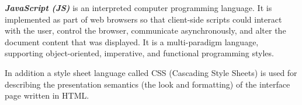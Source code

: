 \emph {\bf JavaScript (JS)} is an interpreted computer programming language. It is  implemented as part of web browsers so that client-side scripts could interact with the user, control the browser, communicate asynchronously, and alter the document content that was displayed. It is a multi-paradigm language, supporting object-oriented, imperative, and functional programming styles.

In addition a style sheet language called CSS (Cascading Style Sheets) is used for describing the presentation semantics (the look and formatting) of the interface page written in HTML.

